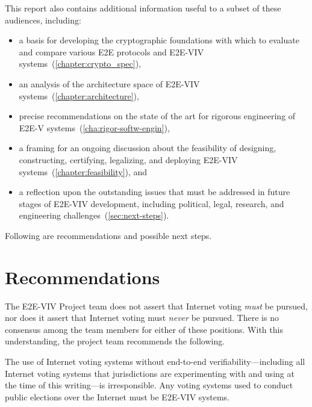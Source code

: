 This report also contains additional information useful to a subset of
these audiences, including:
\begin{itemize}
\item a basis for developing the cryptographic foundations with which
  to evaluate and compare various E2E protocols and E2E-VIV
  systems~(\autoref{chapter:crypto_spec}),
\item an analysis of the architecture space of E2E-VIV
  systems~(\autoref{chapter:architecture}),
\item precise recommendations on the state of the art for rigorous
  engineering of E2E-V systems~(\autoref{cha:rigor-softw-engin}),
\item a framing for an ongoing discussion about the feasibility of
  designing, constructing, certifying, legalizing, and deploying
  E2E-VIV systems~(\autoref{chapter:feasibility}), and
\item a reflection upon the outstanding issues that must be addressed
  in future stages of E2E-VIV development, including political, legal,
  research, and engineering challenges~(\autoref{sec:next-steps}).
\end{itemize}

Following are recommendations and possible next steps.

\section{Recommendations}

The E2E-VIV Project team does not assert that Internet voting
\emph{must} be pursued, nor does it assert that Internet voting must
\emph{never} be pursued. There is no consensus among the team members
for either of these positions. With this understanding, the project
team recommends the following.


The use of Internet voting systems without end-to-end
verifiability---including all Internet voting systems that
jurisdictions are experimenting with and using at the time of this
writing---is irresponsible. Any voting systems used to conduct public
elections over the Internet must be E2E-VIV systems.


